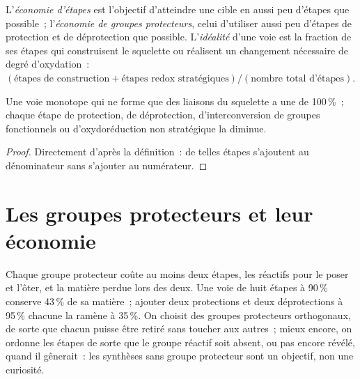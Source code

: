 \begin{definition}\label{def:b3:total-synthesis:economy}
L'\emph{économie d'étapes} est l'objectif d'atteindre une
cible en aussi peu d'étapes que possible~; l'\emph{économie de groupes protecteurs},
celui d'utiliser aussi peu d'étapes de protection et de déprotection que
possible. L'\emph{idéalité} d'une voie est la fraction de ses étapes
qui construisent le squelette ou réalisent un changement nécessaire de
degré d'oxydation~:
$(\text{étapes de construction} + \text{étapes redox stratégiques})/(\text{nombre total d'étapes})$.
\end{definition}

\begin{proposition}\label{prop:b3:total-synthesis:ideality}
Une voie monotope qui ne forme que des liaisons du squelette a une 
de 100\,\%~; chaque étape de protection, de déprotection, d'interconversion
de groupes fonctionnels ou d'oxydoréduction non stratégique la diminue.
\end{proposition}

\begin{proof}
Directement d'après la définition~: de telles étapes s'ajoutent au
dénominateur sans s'ajouter au numérateur.
\end{proof}

\section{Les groupes protecteurs et leur économie}

Chaque groupe protecteur coûte au moins deux étapes, les réactifs pour le
poser et l'ôter, et la matière perdue lors des deux. Une voie de huit
étapes à 90\,\% conserve 43\,\% de sa matière~; ajouter deux protections et
deux déprotections à 95\,\% chacune la ramène à 35\,\%. On choisit des
groupes protecteurs orthogonaux, de sorte que chacun puisse être retiré
sans toucher aux autres~; mieux encore, on ordonne les étapes de sorte que
le groupe réactif soit absent, ou pas encore révélé, quand il gênerait~: les
synthèses sans groupe protecteur sont un objectif, non une curiosité.

